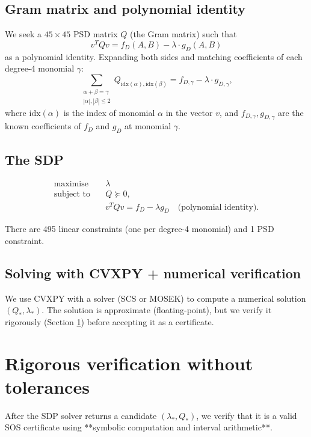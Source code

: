 \documentclass[12pt,a4paper]{article}
\begin{document}
\subsection*{Gram matrix and polynomial identity}

We seek a $45 \times 45$ PSD matrix $Q$ (the Gram matrix) such that
\[
  v^T Q v = f_D(A, B) - \lambda \cdot g_D(A, B)
\]
as a polynomial identity.  Expanding both sides and matching coefficients of each
degree-4 monomial $\gamma$:
\[
  \sum_{\substack{\alpha + \beta = \gamma \\ |\alpha|, |\beta| \leq 2}}
  Q_{\text{idx}(\alpha), \text{idx}(\beta)}
  = f_{D,\gamma} - \lambda \cdot g_{D,\gamma},
\]
where $\text{idx}(\alpha)$ is the index of monomial $\alpha$ in the vector $v$, and
$f_{D,\gamma}, g_{D,\gamma}$ are the known coefficients of $f_D$ and $g_D$ at monomial $\gamma$.

\subsection*{The SDP}

\begin{align}
  \text{maximise} \quad & \lambda \\
  \text{subject to} \quad
    & Q \succeq 0, \\
    & v^T Q v = f_D - \lambda g_D \quad \text{(polynomial identity)}.
\end{align}

There are 495 linear constraints (one per degree-4 monomial) and 1 PSD constraint.

\subsection*{Solving with CVXPY + numerical verification}

We use CVXPY with a solver (SCS or MOSEK) to compute a numerical solution
$(Q_*, \lambda_*)$.  The solution is approximate (floating-point), but we verify it
rigorously (Section \ref{sec:verification}) before accepting it as a certificate.

\section{Rigorous verification without tolerances}
\label{sec:verification}

After the SDP solver returns a candidate $(\lambda_*, Q_*)$, we verify that it is a
valid SOS certificate using **symbolic computation and interval arithmetic**.
\end{document}
